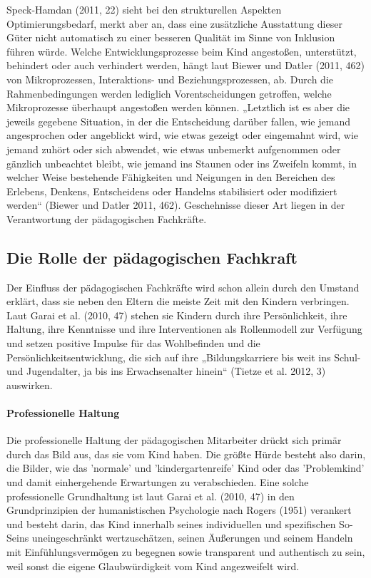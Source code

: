 Speck-Hamdan (2011, 22) sieht bei den strukturellen Aspekten Optimierungsbedarf, merkt aber an, dass eine zusätzliche Ausstattung dieser Güter nicht automatisch zu einer besseren Qualität im Sinne von Inklusion führen würde. Welche Entwicklungsprozesse beim Kind angestoßen, unterstützt, behindert oder auch verhindert werden, hängt laut Biewer und Datler (2011, 462) von Mikroprozessen, Interaktions- und Beziehungsprozessen, ab. Durch die Rahmenbedingungen werden lediglich Vorentscheidungen getroffen, welche Mikroprozesse überhaupt angestoßen werden können. „Letztlich ist es aber die jeweils gegebene Situation, in der die Entscheidung darüber fallen, wie jemand angesprochen oder angeblickt wird, wie etwas gezeigt oder eingemahnt wird, wie jemand zuhört oder sich abwendet, wie etwas unbemerkt aufgenommen oder gänzlich unbeachtet bleibt, wie jemand ins Staunen oder ins Zweifeln kommt, in welcher Weise bestehende Fähigkeiten und Neigungen in den Bereichen des Erlebens, Denkens, Entscheidens oder Handelns stabilisiert oder modifiziert werden“ (Biewer und Datler 2011, 462). Geschehnisse dieser Art liegen in der Verantwortung der pädagogischen Fachkräfte. 

\subsection{Die Rolle der pädagogischen Fachkraft}

Der Einfluss der pädagogischen Fachkräfte wird schon allein durch den Umstand erklärt, dass sie neben den Eltern die meiste Zeit mit den Kindern verbringen. Laut Garai et al. (2010, 47) stehen sie Kindern durch ihre Persönlichkeit, ihre Haltung, ihre Kenntnisse und ihre Interventionen als Rollenmodell zur Verfügung und setzen positive Impulse für das Wohlbefinden und die Persönlichkeitsentwicklung, die sich auf ihre „Bildungskarriere bis weit ins Schul- und Jugendalter, ja bis ins Erwachsenalter hinein“ (Tietze et al. 2012, 3) auswirken.  
 
\paragraph{Professionelle Haltung} 
Die professionelle Haltung der pädagogischen Mitarbeiter drückt sich primär durch das Bild aus, das sie vom Kind haben.
Die größte Hürde besteht also darin, die Bilder, wie das 'normale' und 'kindergartenreife' Kind oder das 'Problemkind' und damit einhergehende Erwartungen zu verabschieden.  
Eine solche professionelle Grundhaltung ist laut Garai et al. (2010, 47) in den Grundprinzipien der humanistischen Psychologie nach Rogers (1951) verankert und besteht darin, das Kind innerhalb seines individuellen und spezifischen So-Seins uneingeschränkt wertzuschätzen, seinen Äußerungen und seinem Handeln mit Einfühlungsvermögen zu begegnen sowie transparent und authentisch zu sein, weil sonst die eigene Glaubwürdigkeit vom Kind angezweifelt wird.
   
